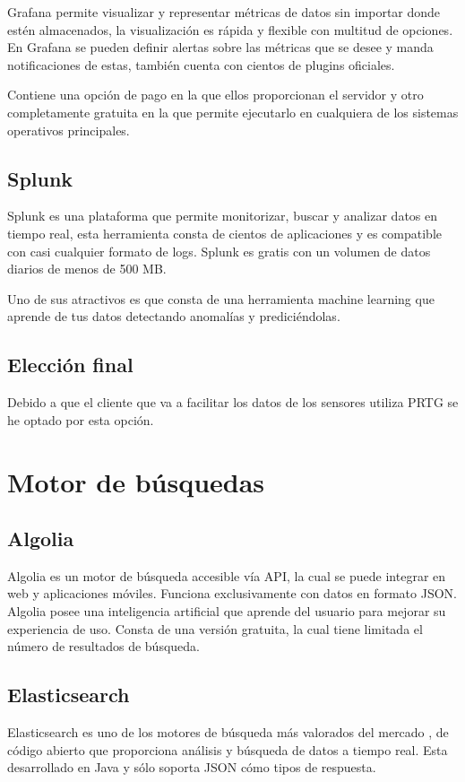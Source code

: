 Grafana permite visualizar y representar métricas de datos sin importar donde estén almacenados, la visualización es rápida y flexible con multitud de opciones. En Grafana se pueden definir alertas sobre las métricas que se desee y manda notificaciones de estas, también cuenta con cientos de plugins oficiales. 

Contiene una opción de pago en la que ellos proporcionan el servidor y otro completamente gratuita en la que permite ejecutarlo en cualquiera de los sistemas operativos principales.\cite{pagina:Grafana}

\subsection{Splunk}
Splunk es una plataforma que permite monitorizar, buscar y analizar datos en tiempo real, esta herramienta consta de cientos de aplicaciones y es compatible con casi cualquier formato de logs. Splunk es gratis con un volumen de datos diarios de menos de 500 MB. \cite{pagina:Splunk}

Uno de sus atractivos es que consta de una herramienta machine learning que aprende de tus datos detectando anomalías y prediciéndolas.

\subsection{Elección final}
Debido a que el cliente que va a facilitar los datos de los sensores utiliza PRTG se he optado por esta opción.

\section{Motor de búsquedas}

\subsection{Algolia}
Algolia es un motor de búsqueda accesible vía API, la cual se puede integrar en web y aplicaciones móviles. Funciona exclusivamente con datos en formato JSON. Algolia posee una inteligencia artificial que aprende del usuario para mejorar su experiencia de uso. Consta de una versión gratuita, la cual tiene limitada el número de resultados de búsqueda.\cite{pagina:Algolia}

\subsection{Elasticsearch}
Elasticsearch es uno de los motores de búsqueda más valorados del mercado\cite{ranking:DB-Engines} , de código abierto que proporciona análisis y búsqueda de datos a tiempo real. Esta desarrollado en Java y sólo soporta JSON cómo tipos de respuesta.

